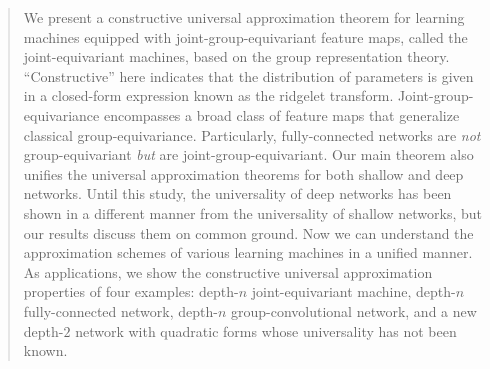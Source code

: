 \begin{abstract}
We present a constructive universal approximation theorem for learning machines equipped with joint-group-equivariant feature maps, called the joint-equivariant machines, based on the group representation theory. ``Constructive'' here indicates that the distribution of parameters is given in a closed-form expression known as the ridgelet transform. Joint-group-equivariance encompasses a broad class of feature maps that generalize classical group-equivariance. Particularly, fully-connected networks are \emph{not} group-equivariant \emph{but} are joint-group-equivariant. Our main theorem also unifies the universal approximation theorems for both shallow and deep networks. Until this study, the universality of deep networks has been shown in a different manner from the universality of shallow networks, but our results discuss them on common ground. Now we can understand the approximation schemes of various learning machines in a unified manner. As applications, we show the constructive universal approximation properties of four examples: depth-$n$ joint-equivariant machine, depth-$n$ fully-connected network, depth-$n$ group-convolutional network, and a new depth-$2$ network with quadratic forms whose universality has not been known.
\end{abstract}
